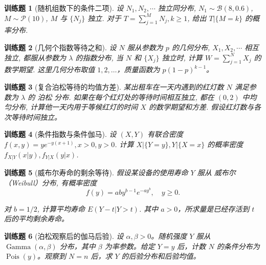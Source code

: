 \documentclass[UTF8,12pt,a4paper,fontset=fandol]{ctexbook}
\newtheorem{exercise}{训练题}[section]
\begin{document}
\begin{exercise}[随机组数下的条件二项]\label{q:A6.1}
设 $N_1,N_2,\cdots$ 独立同分布, $N_1\sim\mathcal{B}(8,0.6)$, $M\sim\mathcal{P}(10)$, $M$ 与 $\{N_j\}$ 独立. 对于 $T=\sum\limits_{j=1}^MN_j,k\geq1$, 给出 $T|\{M=k\}$ 的概率分布.\par{}\end{exercise}

\begin{exercise}[几何个指数等待之和]\label{q:A6.3}
设 $N$ 服从参数为 $p$ 的几何分布, $X_1,X_2,\cdots$ 相互独立, 都服从参数为 $\lambda$ 的指数分布, 当 $N$ 和 $\{X_j\}$ 独立时, 计算 $W=\sum\limits_{j=1}^NX_j$ 的数学期望. 这里几何分布取值 $1,2,\ldots$，质量函数为 $p(1-p)^{k-1}$。\par{}\end{exercise}

\begin{exercise}[复合泊松等待的均值方差]\label{q:A6.4}
某出租车在一天内遇到的红灯数 $N$ 满足参数为 $\lambda$ 的 泊松 分布. 如果在每个红灯处的等待时间相互独立, 都在 $(0,2)$ 中均匀分布, 计算他一天内用于等候红灯的时间 $X$ 的数学期望和方差. 假设红灯数与各次等待时间独立。\par{}\end{exercise}

\begin{exercise}[条件指数与条件伽马]\label{q:A6.9}
设 $(X,Y)$ 有联合密度 $f(x,y)=ye^{-y(x+1)},x>0,y>0$. 计算 $X|\{Y=y\},Y|\{X=x\}$ 的概率密度 $f_{X|Y}(x|y),f_{Y|X}(y|x)$.\par{}\end{exercise}

\begin{exercise}[威布尔寿命的剩余等待]\label{q:A6.14}
假设某设备的使用寿命 $Y$ 服从 威布尔（Weibull）分布, 有概率密度
    \[f(y)=aby^{b-1}e^{-ay^b},\quad y\geq0.\]

    对 $b=1/2$, 计算平均寿命 $E(Y-t|Y>t)$. 其中 $a>0$，所求量是已经存活到 $t$ 后的平均剩余寿命。\par{}\end{exercise}

\begin{exercise}[泊松观察后的伽马后验]\label{q:A6.15}
设 $\alpha,\beta>0$。随机强度 $Y$ 服从 $\operatorname{Gamma}(\alpha,\beta)$ 分布，其中 $\beta$ 为率参数。给定 $Y=y$ 后，计数 $N$ 的条件分布为 $\operatorname{Pois}(y)$。观察到 $N=n$ 后，求 $Y$ 的后验分布和后验均值。\par{}\end{exercise}
\end{document}

